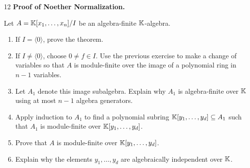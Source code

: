 \documentclass[Notebook.tex]{subfiles}
\begin{document}
\newpage 

\begin{problem}{12} \textbf{Proof of Noether Normalization.} 
    
    Let $A=\mathbb K[x_1,\ldots,x_n]/I$ be an algebra-finite $\mathbb K$-algebra.
    \begin{enumerate}
        \item If $I=\langle 0\rangle$, prove the theorem.
        \item If $I\neq \langle 0\rangle$, choose $0\neq f\in I$. Use the previous exercise to make a change of variables so that $A$ is module-finite over the image of a polynomial ring in $n-1$ variables.
        \item Let $A_1$ denote this image subalgebra. Explain why $A_1$ is algebra-finite over $\mathbb K$ using at most $n-1$ algebra generators.
        \item Apply induction to $A_1$ to find a polynomial subring $\mathbb K[y_1,\ldots,y_d]\subseteq A_1$ such that $A_1$ is module-finite over $\mathbb K[y_1,\ldots,y_d]$.
        \item Prove that $A$ is module-finite over $\mathbb K[y_1,\ldots,y_d]$.
        \item Explain why the elements $y_1,\ldots,y_d$ are algebraically independent over $\mathbb K$.
    \end{enumerate}
\end{problem}
\end{document}

